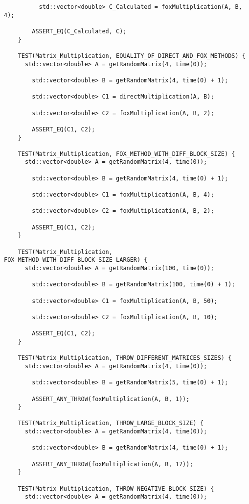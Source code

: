\documentclass{article}
\begin{document}
\begin{lstlisting}
 	 	  std::vector<double> C_Calculated = foxMultiplication(A, B, 4);

    	ASSERT_EQ(C_Calculated, C);
	}

	TEST(Matrix_Multiplication, EQUALITY_OF_DIRECT_AND_FOX_METHODS) {
  	  std::vector<double> A = getRandomMatrix(4, time(0));

    	std::vector<double> B = getRandomMatrix(4, time(0) + 1);

    	std::vector<double> C1 = directMultiplication(A, B);

    	std::vector<double> C2 = foxMultiplication(A, B, 2);

    	ASSERT_EQ(C1, C2);
	}

	TEST(Matrix_Multiplication, FOX_METHOD_WITH_DIFF_BLOCK_SIZE) {
  	  std::vector<double> A = getRandomMatrix(4, time(0));

    	std::vector<double> B = getRandomMatrix(4, time(0) + 1);

    	std::vector<double> C1 = foxMultiplication(A, B, 4);

    	std::vector<double> C2 = foxMultiplication(A, B, 2);

    	ASSERT_EQ(C1, C2);
	}

	TEST(Matrix_Multiplication, FOX_METHOD_WITH_DIFF_BLOCK_SIZE_LARGER) {
  	  std::vector<double> A = getRandomMatrix(100, time(0));

    	std::vector<double> B = getRandomMatrix(100, time(0) + 1);

    	std::vector<double> C1 = foxMultiplication(A, B, 50);

    	std::vector<double> C2 = foxMultiplication(A, B, 10);

    	ASSERT_EQ(C1, C2);
	}

	TEST(Matrix_Multiplication, THROW_DIFFERENT_MATRICES_SIZES) {
  	  std::vector<double> A = getRandomMatrix(4, time(0));

    	std::vector<double> B = getRandomMatrix(5, time(0) + 1);

    	ASSERT_ANY_THROW(foxMultiplication(A, B, 1));
	}

	TEST(Matrix_Multiplication, THROW_LARGE_BLOCK_SIZE) {
  	  std::vector<double> A = getRandomMatrix(4, time(0));

    	std::vector<double> B = getRandomMatrix(4, time(0) + 1);

    	ASSERT_ANY_THROW(foxMultiplication(A, B, 17));
	}

	TEST(Matrix_Multiplication, THROW_NEGATIVE_BLOCK_SIZE) {
  	  std::vector<double> A = getRandomMatrix(4, time(0));


\end{lstlisting}
\end{document}
